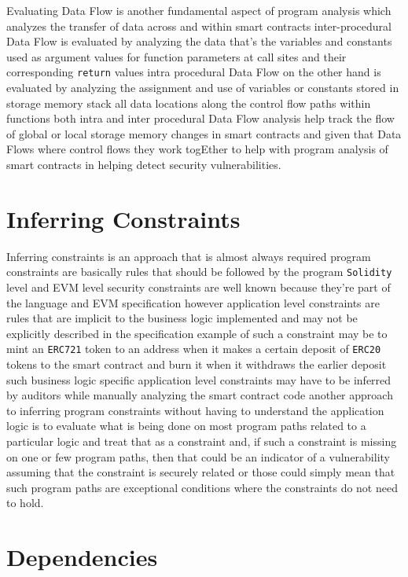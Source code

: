 Evaluating Data Flow is another fundamental aspect of program analysis which analyzes the transfer of data across and within smart contracts inter-procedural Data Flow is evaluated by analyzing the data that's the variables and constants used as argument values for function parameters at call sites and their corresponding \verb|return| values intra procedural Data Flow on the other hand is evaluated by analyzing the assignment and use of variables or constants stored in storage memory stack all data locations along the control flow paths within functions both intra and inter procedural Data Flow analysis help track the flow of global or local storage memory changes in smart contracts and given that Data Flows where control flows they work togEther to help with program analysis of smart contracts in helping detect security vulnerabilities.

\section{Inferring Constraints}

Inferring constraints is an approach that is almost always required program constraints are basically rules that should be followed by the program \verb|Solidity| level and EVM level security constraints are well known because they're part of the language and EVM specification however application level constraints are rules that are implicit to the business logic implemented and may not be explicitly described in the specification example of such a constraint may be to mint an \verb|ERC721| token to an address when it makes a certain deposit of \verb|ERC20| tokens to the smart contract and burn it when it withdraws the earlier deposit such business logic specific application level constraints may have to be inferred by auditors while manually analyzing the smart contract code another approach to inferring program constraints without having to understand the application logic is to evaluate what is being done on most program paths related to a particular logic and treat that as a constraint and, if such a constraint is missing on one or few program paths, then that could be an indicator of a vulnerability assuming that the constraint is securely related or those could simply mean that such program paths are exceptional conditions where the constraints do not need to hold.

\section{Dependencies}

